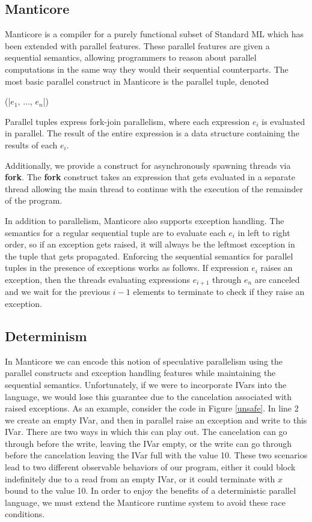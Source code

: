 \subsection{Manticore}

Manticore is a compiler for a purely functional subset of Standard ML which has been extended with parallel features.  These parallel features are given a sequential semantics, allowing programmers to reason about parallel computations in the same way they would their sequential counterparts.  The most basic parallel construct in Manticore is the parallel tuple, denoted

\begin{centercode}
\cdmath{}(|$e_1$, $\ldots$, $e_n$|)
\end{centercode}%

Parallel tuples express fork-join parallelism, where each expression $e_i$ is evaluated in parallel.  The result of the entire expression is a data structure containing the results of each $e_i$.

Additionally, we provide a construct for asynchronously spawning threads via {\bf fork}.  The {\bf fork} construct takes an expression that gets evaluated in a separate thread allowing the main thread to continue with the execution of the remainder of the program.  

 In addition to parallelism, Manticore also supports exception handling.  The semantics for a regular sequential tuple are to evaluate each $e_i$ in left to right order, so if an exception gets raised, it will always be the leftmost exception in the tuple that gets propagated.  Enforcing the sequential semantics for parallel tuples in the presence of exceptions works as follows.  If expression $e_i$ raises an exception, then the threads evaluating expressions $e_{i+1}$ through $e_n$ are canceled and we wait for the previous $i-1$ elements to terminate to check if they raise an exception. 


\subsection{Determinism}
In Manticore we can encode this notion of speculative parallelism using the parallel constructs and exception handling features while maintaining the sequential semantics\cite{implicit-threading-in-manticore}.  Unfortunately, if we were to incorporate IVars into the language, we would lose this guarantee due to the cancelation associated with raised exceptions.  As an example, consider the code in Figure \ref{unsafe}.  In line 2 we create an empty IVar, and then in parallel raise an exception and write to this IVar.  There are two ways in which this can play out.  The cancelation can go through before the write, leaving the IVar empty, or the write can go through before the cancelation leaving the IVar full with the value 10.  These two scenarios lead to two different observable behaviors of our program, either it could block indefinitely due to a read from an empty IVar, or it could terminate with $x$ bound to the value 10.  In order to enjoy the benefits of a deterministic parallel language, we must extend the Manticore runtime system to avoid these race conditions.

